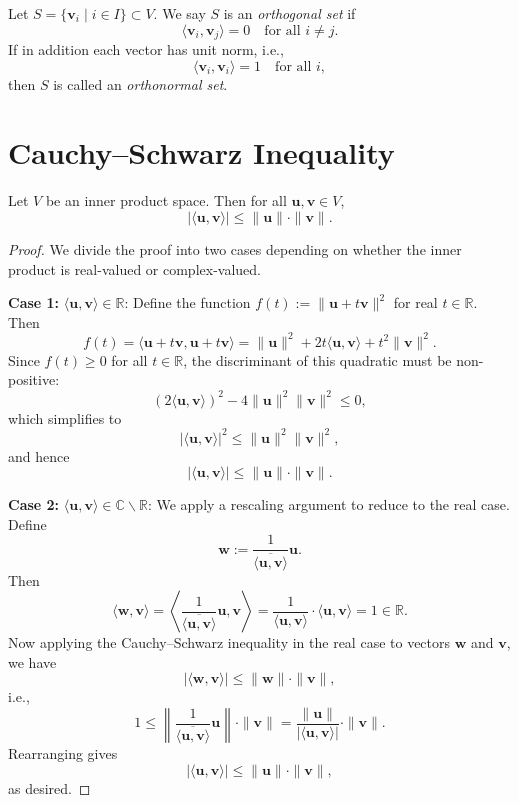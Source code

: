 \begin{definition}\label{def:orthogonal}
Let \( S = \{ \mathbf{v}_i \mid i \in I \} \subset V \). We say \( S \) is an \emph{orthogonal set} if
\[
\langle \mathbf{v}_i, \mathbf{v}_j \rangle = 0 \quad \text{for all } i \neq j.
\]
If in addition each vector has unit norm, i.e.,
\[
\langle \mathbf{v}_i, \mathbf{v}_i \rangle = 1 \quad \text{for all } i,
\]
then \( S \) is called an \emph{orthonormal set}.
\end{definition}

\section{Cauchy–Schwarz Inequality}
\begin{proposition}\label{prop:cauchy-schwarz}
Let \( V \) be an inner product space. Then for all \( \mathbf{u}, \mathbf{v} \in V \),
\[
| \langle \mathbf{u}, \mathbf{v} \rangle | \leq \| \mathbf{u} \| \cdot \| \mathbf{v} \|.
\]
\end{proposition}

\begin{proof}
We divide the proof into two cases depending on whether the inner product is real-valued or complex-valued.

\textbf{Case 1:} \( \langle \mathbf{u}, \mathbf{v} \rangle \in \mathbb{R} \): Define the function \( f(t) := \| \mathbf{u} + t\mathbf{v} \|^2 \) for real \( t \in \mathbb{R} \). Then
\[
f(t) = \langle \mathbf{u} + t\mathbf{v}, \mathbf{u} + t\mathbf{v} \rangle = \| \mathbf{u} \|^2 + 2t \langle \mathbf{u}, \mathbf{v} \rangle + t^2 \| \mathbf{v} \|^2.
\]
Since \( f(t) \geq 0 \) for all \( t \in \mathbb{R} \), the discriminant of this quadratic must be non-positive:
\[
(2 \langle \mathbf{u}, \mathbf{v} \rangle)^2 - 4 \| \mathbf{u} \|^2 \| \mathbf{v} \|^2 \leq 0,
\]
which simplifies to
\[
|\langle \mathbf{u}, \mathbf{v} \rangle|^2 \leq \| \mathbf{u} \|^2 \| \mathbf{v} \|^2,
\]
and hence
\[
|\langle \mathbf{u}, \mathbf{v} \rangle| \leq \| \mathbf{u} \| \cdot \| \mathbf{v} \|.
\]

\textbf{Case 2:} \( \langle \mathbf{u}, \mathbf{v} \rangle \in \mathbb{C} \smallsetminus \mathbb{R} \): We apply a rescaling argument to reduce to the real case. Define
\[
\mathbf{w} := \frac{1}{\overline{\langle \mathbf{u}, \mathbf{v} \rangle}} \mathbf{u}.
\]
Then
\[
\langle \mathbf{w}, \mathbf{v} \rangle 
= \left\langle \frac{1}{\overline{\langle \mathbf{u}, \mathbf{v} \rangle}} \mathbf{u}, \mathbf{v} \right\rangle
= \frac{1}{\langle \mathbf{u}, \mathbf{v} \rangle} \cdot \langle \mathbf{u}, \mathbf{v} \rangle = 1 \in \mathbb{R}.
\]
Now applying the Cauchy–Schwarz inequality in the real case to vectors \( \mathbf{w} \) and \( \mathbf{v} \), we have
\[
| \langle \mathbf{w}, \mathbf{v} \rangle | \leq \| \mathbf{w} \| \cdot \| \mathbf{v} \|,
\]
i.e.,
\[
1 \leq \left\| \frac{1}{\overline{\langle \mathbf{u}, \mathbf{v} \rangle}} \mathbf{u} \right\| \cdot \| \mathbf{v} \| = \frac{\| \mathbf{u} \|}{| \langle \mathbf{u}, \mathbf{v} \rangle |} \cdot \| \mathbf{v} \|.
\]
Rearranging gives
\[
| \langle \mathbf{u}, \mathbf{v} \rangle | \leq \| \mathbf{u} \| \cdot \| \mathbf{v} \|,
\]
as desired.
\end{proof}

